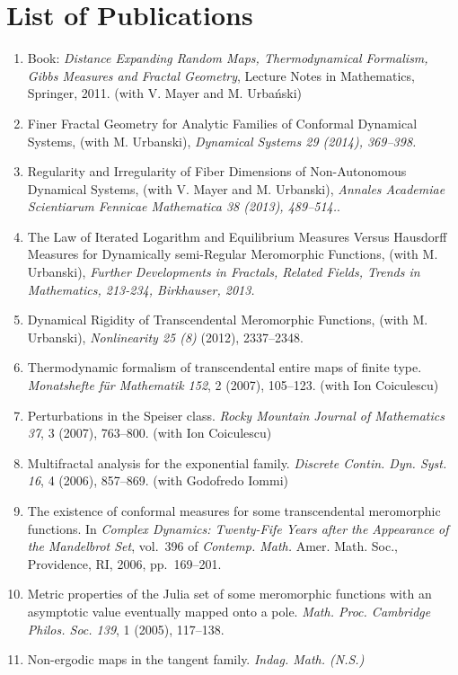 \documentclass{article}
\begin{document}
\section*{List of Publications}
\begin{enumerate}
\item Book: \emph{Distance Expanding Random Maps, Thermodynamical
    Formalism, Gibbs Measures and Fractal Geometry}, Lecture Notes in
  Mathematics,  Springer, 2011. (with V. Mayer and M. Urba{\'n}ski)
\item Finer Fractal Geometry for Analytic Families of Conformal
  Dynamical Systems, (with M. Urbanski), \emph{Dynamical Systems 29
    (2014), 369--398.}
\item Regularity and Irregularity of Fiber Dimensions of
  Non-Autonomous Dynamical Systems, (with V. Mayer and M. Urbanski),
  {\em Annales Academiae Scientiarum Fennicae Mathematica 38 (2013),
    489--514.}.
\item The Law of Iterated Logarithm and Equilibrium Measures Versus
  Hausdorff Measures for Dynamically semi-Regular Meromorphic
  Functions, (with M. Urbanski), \emph{Further Developments in
    Fractals, Related Fields, Trends in Mathematics, 213-234,
    Birkhauser, 2013.}
\item Dynamical Rigidity of Transcendental Meromorphic Functions,
  (with M. Urbanski), {\em Nonlinearity 25 (8)} (2012), 2337--2348.
\item Thermodynamic formalism of transcendental entire maps of finite
  type. {\em Monatshefte f\"ur Mathematik 152}, 2 (2007), 105--123.
  (with Ion Coiculescu)
\item Perturbations in the {S}peiser class.  {\em Rocky Mountain
    Journal of Mathematics 37}, 3 (2007), 763--800. (with Ion Coiculescu)
\item Multifractal analysis for the exponential family.  {\em Discrete
    Contin. Dyn. Syst. 16}, 4 (2006), 857--869.  (with Godofredo Iommi)
\item The existence of conformal measures for some transcendental
  meromorphic functions. In {\em Complex Dynamics: Twenty-Fife Years
    after the Appearance of the Mandelbrot Set}, vol.~396 of {\em
    Contemp. Math.} Amer. Math. Soc., Providence, RI, 2006,
  pp.~169--201.
\item Metric properties of the {J}ulia set of some meromorphic
  functions with an asymptotic value eventually mapped onto a pole.
  {\em Math. Proc. Cambridge Philos. Soc. 139}, 1 (2005), 117--138.
\item Non-ergodic maps in the tangent family. {\em Indag. Math. (N.S.)
}
\end{enumerate}
\end{document}
